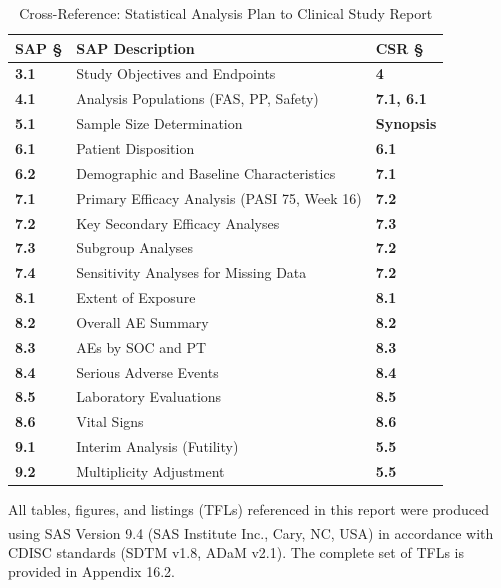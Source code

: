 \documentclass[11pt, a4paper]{article}
\begin{document}
\vspace{4pt}
\begin{table}[H]
\centering
\caption{Cross-Reference: Statistical Analysis Plan to Clinical Study Report}
\label{tab:saper}
\small
\begin{tabularx}{\linewidth}{@{}>{\color{accent}\bfseries}l@{\hspace{6mm}}>{\raggedright\arraybackslash}X@{\hspace{6mm}}>{\bfseries}l@{}}
\toprule
\textbf{SAP \S} & \textbf{SAP Description} & \textbf{CSR \S} \\
\midrule
3.1   & Study Objectives and Endpoints             & 4 \\
4.1   & Analysis Populations (FAS, PP, Safety)     & 7.1, 6.1 \\
5.1   & Sample Size Determination                  & Synopsis \\
6.1   & Patient Disposition                        & 6.1 \\
6.2   & Demographic and Baseline Characteristics   & 7.1 \\
7.1   & Primary Efficacy Analysis (PASI 75, Week 16) & 7.2 \\
7.2   & Key Secondary Efficacy Analyses             & 7.3 \\
7.3   & Subgroup Analyses                           & 7.2 \\
7.4   & Sensitivity Analyses for Missing Data       & 7.2 \\
8.1   & Extent of Exposure                          & 8.1 \\
8.2   & Overall AE Summary                          & 8.2 \\
8.3   & AEs by SOC and PT                           & 8.3 \\
8.4   & Serious Adverse Events                      & 8.4 \\
8.5   & Laboratory Evaluations                      & 8.5 \\
8.6   & Vital Signs                                 & 8.6 \\
9.1   & Interim Analysis (Futility)                 & 5.5 \\
9.2   & Multiplicity Adjustment                     & 5.5 \\
\bottomrule
\end{tabularx}
\end{table}

\begin{notebox}
All tables, figures, and listings (TFLs) referenced in this report were produced using SAS\textsuperscript{\textregistered} Version 9.4 (SAS Institute Inc., Cary, NC, USA) in accordance with CDISC standards (SDTM v1.8, ADaM v2.1). The complete set of TFLs is provided in Appendix 16.2.
\end{notebox}
\end{document}
